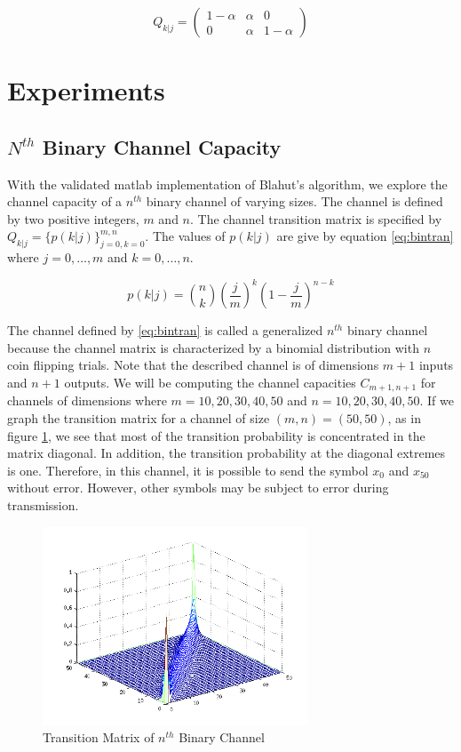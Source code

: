 \documentclass[journal]{IEEEtran}
\begin{document}
\begin{equation}
\label{eq:binTran}
Q_{k|j} = 
\begin{pmatrix}
1-\alpha & \alpha & 0 \\
0 & \alpha & 1-\alpha
\end{pmatrix}
\end{equation}

\section{Experiments}
\subsection{\(N^{th}\) Binary Channel Capacity}
\par With the validated matlab implementation of Blahut's algorithm, we explore the channel capacity of a \(n^{th}\) binary channel of varying sizes. The channel is defined by two positive integers, \(m\) and \(n\). The channel transition matrix is specified by \(Q_{k|j} = \{p(k|j)\}_{j=0,k=0}^{m,n}\). The values of \(p(k|j)\) are give by equation \ref{eq:bintran} where \(j = 0,\dots,m\) and \(k = 0,\dots,n\).

\begin{equation}
\label{eq:bintran}
p(k|j) = {n \choose k} \left(\frac{j}{m}\right)^k \left(1-\frac{j}{m}\right)^{n-k}
\end{equation}

\par The channel defined by \ref{eq:bintran} is called a generalized \(n^{th}\) binary channel because the channel matrix is characterized by a binomial distribution with \(n\) coin flipping trials. Note that the described channel is of dimensions \(m+1\) inputs and \(n+1\) outputs. We will be computing the channel capacities \(C_{m+1,n+1}\) for channels of dimensions where \(m=10,20,30,40,50\) and \(n=10,20,30,40,50\). If we graph the transition matrix for a channel of size \( (m,n) = (50,50) \), as in figure \ref{fig:nthbinplot}, we see that most of the transition probability is concentrated in the matrix diagonal. In addition, the transition probability at the diagonal extremes is one. Therefore, in this channel, it is possible to send the symbol \(x_0\) and \(x_{50}\) without error. However, other symbols may be subject to error during transmission.

\begin{figure}[h]
\centering
\includegraphics[width=3.1in]{../images/nthBinaryChannel.png}
\caption{Transition Matrix of \(n^{th}\) Binary Channel}
\label{fig:nthbinplot}
\end{figure}
\end{document}
